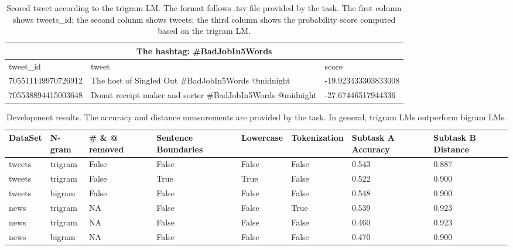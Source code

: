\documentclass[11pt,a4paper]{article}
\begin{document}
\begin{table*}[h!]
\centering
\begin{tabular}{ |p{4.7cm}|p{4.7cm}|p{4.7cm}| } 
\hline
\multicolumn{3}{|c|}{The hashtag: \#BadJobIn5Words} \\
\hline
tweet\_id & tweet & score \\
\hline 
705511149970726912 & The host of Singled Out \#BadJobIn5Words @midnight & -19.923433303833008 \\
\hline
705538894415003648 & Donut receipt maker and sorter  \#BadJobIn5Words @midnight & -27.67446517944336 \\
\hline
\end{tabular}
\caption{Scored tweet according to the trigram LM. The format follows .tsv file provided by the task. The first column shows tweets\_id; the second column shows tweets; the third column shows the probability score computed based on the trigram LM. }
\label{table:2}
\end{table*}

\begin{table*}[h!]
\centering
\begin{tabular}{ |p{1.2cm}|p{1.2cm}|p{1.2cm}|p{1.7cm}|p{1.5cm}|p{1.9cm}|p{1.7cm}|p{1.7cm}|}
\hline
DataSet & N-gram & \# \& @ removed  & Sentence Boundaries & Lowercase & Tokenization & Subtask A Accuracy & Subtask B Distance \\
\hline
tweets & trigram & False & False & False & False & 0.543 & 0.887 \\
\hline
tweets & trigram & False & True & True & False & 0.522 & 0.900 \\
\hline
tweets & bigram & False & False & False & False & 0.548 & 0.900 \\ 
\hline
news & trigram & NA & False & False & True & 0.539 & 0.923 \\
\hline
news & trigram & NA & False & False & False & 0.460 & 0.923 \\
\hline
news & bigram & NA & False & False & False & 0.470 & 0.900 \\
\hline
\end{tabular}
\caption{Development results. The accuracy and distance measurements are provided by the task. In general, trigram LMs outperform bigram LMs.}
\label{table:3}
\end{table*}
\end{document}
